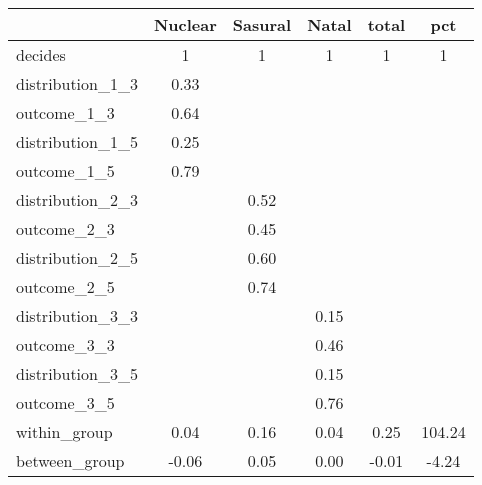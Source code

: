 \begin{tabular}{l*{5}{c}}
\toprule
            &\multicolumn{1}{c}{Nuclear}&\multicolumn{1}{c}{Sasural}&\multicolumn{1}{c}{Natal}&\multicolumn{1}{c}{total}&\multicolumn{1}{c}{pct}\\
\midrule
decides     &           1&           1&           1&           1&           1\\
\midrule
distribution\_1\_3&        0.33&            &            &            &            \\
outcome\_1\_3 &        0.64&            &            &            &            \\
distribution\_1\_5&        0.25&            &            &            &            \\
outcome\_1\_5 &        0.79&            &            &            &            \\
distribution\_2\_3&            &        0.52&            &            &            \\
outcome\_2\_3 &            &        0.45&            &            &            \\
distribution\_2\_5&            &        0.60&            &            &            \\
outcome\_2\_5 &            &        0.74&            &            &            \\
distribution\_3\_3&            &            &        0.15&            &            \\
outcome\_3\_3 &            &            &        0.46&            &            \\
distribution\_3\_5&            &            &        0.15&            &            \\
outcome\_3\_5 &            &            &        0.76&            &            \\
within\_group&        0.04&        0.16&        0.04&        0.25&      104.24\\
between\_group&       -0.06&        0.05&        0.00&       -0.01&       -4.24\\
\bottomrule
\end{tabular}
